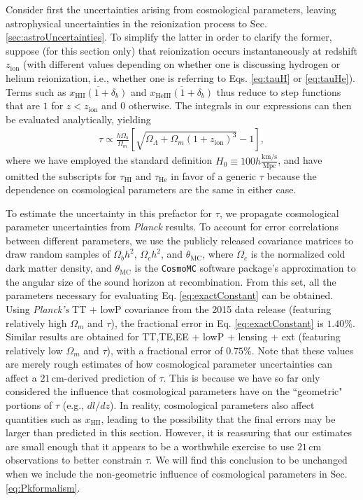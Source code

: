\documentclass[twocolumn,aps,prd,nofootinbib,showpacs]{revtex4-1}
\begin{document}
Consider first the uncertainties arising from cosmological parameters, leaving astrophysical uncertainties in the reionization process to Sec. \ref{sec:astroUncertainties}. To simplify the latter in order to clarify the former, suppose (for this section only) that reionization occurs instantaneously at redshift $z_\textrm{ion}$ (with different values depending on whether one is discussing hydrogen or helium reionization, i.e., whether one is referring to Eqs. \ref{eq:tauH} or \ref{eq:tauHe}). Terms such as $\overline{x_\textrm{HII} (1+\delta_b)}$ and $\overline{x_\textrm{HeIII} (1+\delta_b)}$ thus reduce to step functions that are $1$ for $z<z_\textrm{ion}$ and $0$ otherwise. The integrals in our expressions can then be evaluated analytically, yielding
\begin{eqnarray}
\label{eq:exactConstant}
\tau \propto \frac{h \Omega_b }{\Omega_m} \left[ \sqrt{\Omega_\Lambda + \Omega_m (1+z_\textrm{ion})^3} - 1 \right],
\end{eqnarray}
where we have employed the standard definition $H_0 \equiv 100h \frac{\textrm{km}/\textrm{s}}{\textrm{Mpc}}$, and have omitted the subscripts for $\tau_\textrm{HI}$ and $\tau_\textrm{He}$ in favor of a generic $\tau$ because the dependence on cosmological parameters are the same in either case.

To estimate the uncertainty in this prefactor for $\tau$, we propagate cosmological parameter uncertainties from \emph{Planck} results. To account for error correlations between different parameters, we use the publicly released covariance matrices to draw random samples of $\Omega_b h^2$, $\Omega_c h^2$, and $\theta_\textrm{MC}$, where $\Omega_c$ is the normalized cold dark matter density, and $\theta_\textrm{MC}$ is the {\tt CosmoMC} software package's approximation to the angular size of the sound horizon at recombination. From this set, all the parameters necessary for evaluating Eq. \eqref{eq:exactConstant} can be obtained. Using \emph{Planck's} TT + lowP covariance from the 2015 data release (featuring relatively high $\Omega_m$ and $\tau$), the fractional error in Eq. \eqref{eq:exactConstant} is $1.40\%$. Similar results are obtained for TT,TE,EE + lowP + lensing + ext (featuring relatively low $\Omega_m$ and $\tau$), with a fractional error of $0.75\%$. Note that these values are merely rough estimates of how cosmological parameter uncertainties can affect a $21\,\textrm{cm}$-derived prediction of $\tau$. This is because we have so far only considered the influence that cosmological parameters have on the ``geometric" portions of $\tau$ (e.g., $dl/dz$). In reality, cosmological parameters also affect quantities such as $x_\textrm{HII}$, leading to the possibility that the final errors may be larger than predicted in this section. However, it is reassuring that our estimates are small enough that it appears to be a worthwhile exercise to use $21\,\textrm{cm}$ observations to better constrain $\tau$. We will find this conclusion to be unchanged when we include the non-geometric influence of cosmological parameters in Sec. \ref{eq:Pkformalism}.
\end{document}
